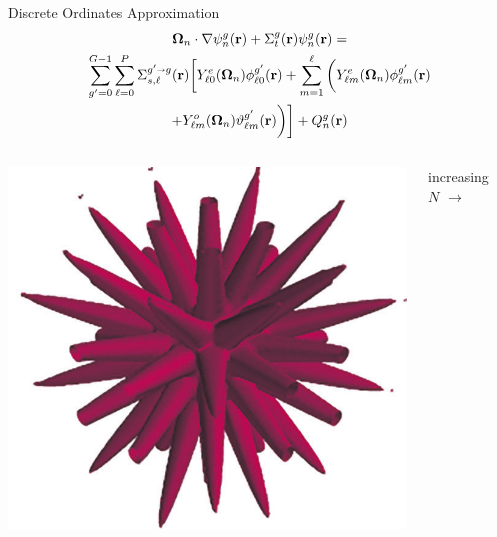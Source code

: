 \documentclass{beamer}
\newcommand{\bo}{\mathbf\Omega}
\newcommand{\vecr}{\textbf{r}}
\newcommand{\sa}{\shortrightarrow}
\newcommand{\Ye}[2]{\ensuremath{Y^e_{#1}(\bo_#2)}}
\newcommand{\Yo}[2]{\ensuremath{Y^o_{#1}(\bo_#2)}}
\begin{document}
\begin{frame}{Discrete Ordinates Approximation}
%
\vspace{-2em}
%
\begin{multline*}
\bo_n \cdot \nabla \psi_n^g(\vecr) + \Sigma_t^g(\vecr)\psi_n^g(\vecr) = \\
\sum_{g'=0}^{G-1}\sum_{\ell=0}^{P}\Sigma_{s,\ell}^{g'\sa g}(\vecr)
\bigg[\Ye{\ell 0}{n}\phi_{\ell 0}^{g'}(\vecr) + \sum_{m=1}^{\ell}
\bigg(\Ye{\ell m}{n}\phi_{\ell m}^{g'}(\vecr) \\
 + \Yo{\ell m}{n}\vartheta_{\ell m}^{g'}(\vecr)\bigg)\bigg]
+ Q_n^g(\vecr)
\end{multline*}
%
\pause
%
\begin{columns}
\begin{column}{0.4\textwidth}
\includegraphics[width=\textwidth,natwidth=654,natheight=593]{img/ray-effects.png}
\end{column}
\pause
\begin{column}{0.2\textwidth}
\center\large increasing $N$
\vspace{-1.5em}
\center\Huge$\rightarrow$
\end{column}
\begin{column}{0.4\textwidth}

\end{column}
\end{columns}
\end{frame}
\end{document}

